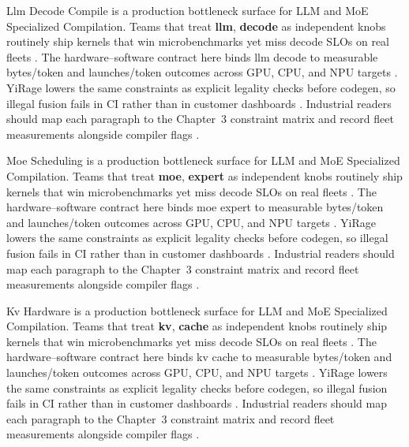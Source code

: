 Llm Decode Compile is a production bottleneck surface for LLM and MoE Specialized Compilation. Teams that treat \textbf{llm}, \textbf{decode} as independent knobs routinely ship kernels that win microbenchmarks yet miss decode SLOs on real fleets \citep{nvidia2024cudagraphs,taxbreak2026}. The hardware--software contract here binds llm decode to measurable bytes/token and launches/token outcomes across GPU, CPU, and NPU targets \citep{liu2024deepseekv3,memoryfloor2026}. YiRage lowers the same constraints as explicit legality checks before codegen, so illegal fusion fails in CI rather than in customer dashboards \citep{patel2025llminference,nvidia2022hopper}. Industrial readers should map each paragraph to the Chapter~3 constraint matrix and record fleet measurements alongside compiler flags \citep{taxbreak2026,semianalysis2024tma}.

Moe Scheduling is a production bottleneck surface for LLM and MoE Specialized Compilation. Teams that treat \textbf{moe}, \textbf{expert} as independent knobs routinely ship kernels that win microbenchmarks yet miss decode SLOs on real fleets \citep{liu2024deepseekv3,memoryfloor2026}. The hardware--software contract here binds moe expert to measurable bytes/token and launches/token outcomes across GPU, CPU, and NPU targets \citep{patel2025llminference,nvidia2022hopper}. YiRage lowers the same constraints as explicit legality checks before codegen, so illegal fusion fails in CI rather than in customer dashboards \citep{taxbreak2026,semianalysis2024tma}. Industrial readers should map each paragraph to the Chapter~3 constraint matrix and record fleet measurements alongside compiler flags \citep{memoryfloor2026,amd2024xdna}.

Kv Hardware is a production bottleneck surface for LLM and MoE Specialized Compilation. Teams that treat \textbf{kv}, \textbf{cache} as independent knobs routinely ship kernels that win microbenchmarks yet miss decode SLOs on real fleets \citep{patel2025llminference,nvidia2022hopper}. The hardware--software contract here binds kv cache to measurable bytes/token and launches/token outcomes across GPU, CPU, and NPU targets \citep{taxbreak2026,semianalysis2024tma}. YiRage lowers the same constraints as explicit legality checks before codegen, so illegal fusion fails in CI rather than in customer dashboards \citep{memoryfloor2026,amd2024xdna}. Industrial readers should map each paragraph to the Chapter~3 constraint matrix and record fleet measurements alongside compiler flags \citep{nvidia2022hopper,amd2024aie}.

